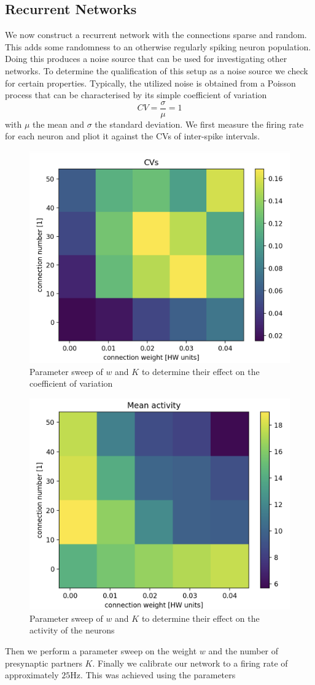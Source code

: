 \documentclass[a4paper,twocolumn]{article}
\begin{document}
\subsection{Recurrent Networks}
We now construct a recurrent network with the connections sparse and random. 
This adds some randomness to an otherwise regularly spiking neuron population. 
Doing this produces a noise source that can be used for investigating other networks.
To determine the qualification of this setup as a noise source we check for certain 
properties.  Typically,  the utilized noise is obtained from a Poisson process 
that can be characterised by its simple coefficient of variation
\begin{equation}
	CV = \frac{\sigma}{\mu} = 1
\end{equation}
with $\mu$ the mean and $\sigma$ the standard deviation. We first measure the 
firing rate for each neuron and pliot it against the CVs of inter-spike intervals. 
\begin{figure}[ht]
    \centering
    \includegraphics[width=.5\textwidth]{figures/CV_sweep.png}
    \caption{Parameter sweep of $w$ and $K$ to determine their effect on the coefficient of variation }
    \label{fig:4membranes}
\end{figure}
\begin{figure}[ht]
    \centering
    \includegraphics[width=.5\textwidth]{figures/activity_sweep.png}
    \caption{Parameter sweep of $w$ and $K$ to determine their effect on the activity of the neurons}
    \label{fig:4membranes}
\end{figure}
Then we perform a parameter sweep on the weight $w$ and the number of presynaptic 
partners $K$.  %
Finally we calibrate our network to a firing rate of approximately $25$Hz.  This 
was achieved using the parameters %
\end{document}
